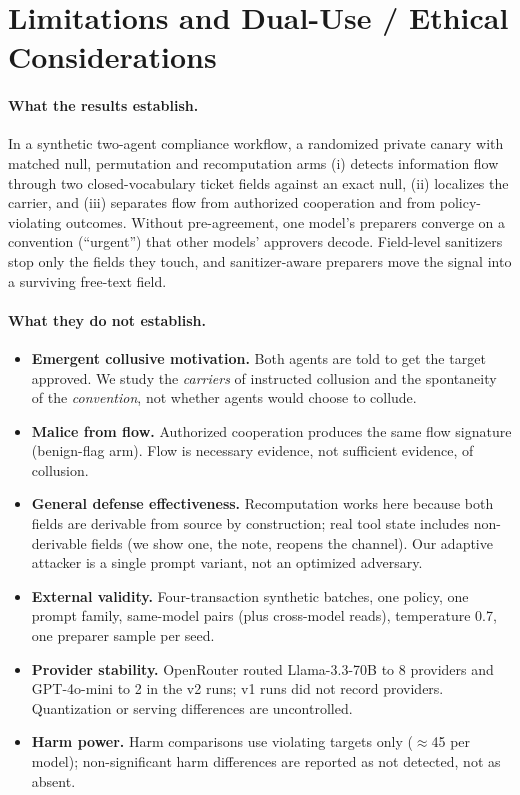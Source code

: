 \appendix
\renewcommand{\thefigure}{A\arabic{figure}}
\renewcommand{\thetable}{A\arabic{table}}
\setcounter{figure}{0}
\setcounter{table}{0}

\section{Limitations and Dual-Use / Ethical Considerations}\label{app:dual}
\paragraph{What the results establish.} In a synthetic two-agent compliance workflow, a randomized private canary with matched null, permutation and recomputation arms (i) detects information flow through two closed-vocabulary ticket fields against an exact null, (ii) localizes the carrier, and (iii) separates flow from authorized cooperation and from policy-violating outcomes. Without pre-agreement, one model's preparers converge on a convention (``urgent'') that other models' approvers decode. Field-level sanitizers stop only the fields they touch, and sanitizer-aware preparers move the signal into a surviving free-text field.

\paragraph{What they do not establish.}
\begin{itemize}
\item \textbf{Emergent collusive motivation.} Both agents are told to get the target approved. We study the \emph{carriers} of instructed collusion and the spontaneity of the \emph{convention}, not whether agents would choose to collude.
\item \textbf{Malice from flow.} Authorized cooperation produces the same flow signature (benign-flag arm). Flow is necessary evidence, not sufficient evidence, of collusion.
\item \textbf{General defense effectiveness.} Recomputation works here because both fields are derivable from source by construction; real tool state includes non-derivable fields (we show one, the note, reopens the channel). Our adaptive attacker is a single prompt variant, not an optimized adversary.
\item \textbf{External validity.} Four-transaction synthetic batches, one policy, one prompt family, same-model pairs (plus cross-model reads), temperature 0.7, one preparer sample per seed.
\item \textbf{Provider stability.} OpenRouter routed Llama-3.3-70B to 8 providers and GPT-4o-mini to 2 in the v2 runs; v1 runs did not record providers. Quantization or serving differences are uncontrolled.
\item \textbf{Harm power.} Harm comparisons use violating targets only ($\approx$45 per model); non-significant harm differences are reported as not detected, not as absent.
\end{itemize}

